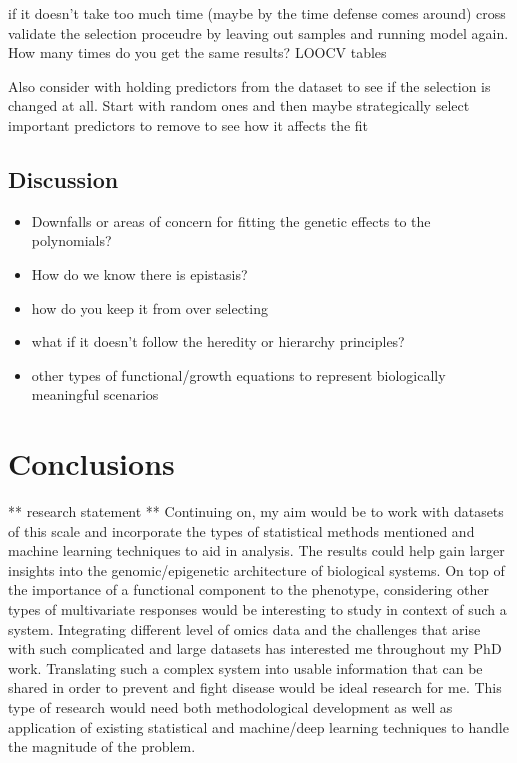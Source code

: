 \documentclass[11pt,]{book}
\providecommand{\tightlist}{%
  \setlength{\itemsep}{0pt}\setlength{\parskip}{0pt}}
\theoremstyle{definition}
\theoremstyle{definition}
\theoremstyle{remark}
\begin{document}
if it doesn't take too much time (maybe by the time defense comes
around) cross validate the selection proceudre by leaving out samples
and running model again. How many times do you get the same results?
LOOCV tables

Also consider with holding predictors from the dataset to see if the
selection is changed at all. Start with random ones and then maybe
strategically select important predictors to remove to see how it
affects the fit

\section{Discussion}\label{discussion-2}

\begin{itemize}
\tightlist
\item
  Downfalls or areas of concern for fitting the genetic effects to the
  polynomials?
\item
  How do we know there is epistasis?
\item
  how do you keep it from over selecting
\item
  what if it doesn't follow the heredity or hierarchy principles?
\item
  other types of functional/growth equations to represent biologically
  meaningful scenarios
\end{itemize}

\chapter{Conclusions}\label{conclusions}

** research statement ** Continuing on, my aim would be to work with
datasets of this scale and incorporate the types of statistical methods
mentioned and machine learning techniques to aid in analysis. The
results could help gain larger insights into the genomic/epigenetic
architecture of biological systems. On top of the importance of a
functional component to the phenotype, considering other types of
multivariate responses would be interesting to study in context of such
a system. Integrating different level of omics data and the challenges
that arise with such complicated and large datasets has interested me
throughout my PhD work. Translating such a complex system into usable
information that can be shared in order to prevent and fight disease
would be ideal research for me. This type of research would need both
methodological development as well as application of existing
statistical and machine/deep learning techniques to handle the magnitude
of the problem.
\end{document}
